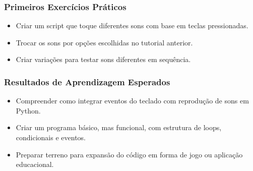 \documentclass[11pt,a4paper]{article}
\begin{document}
\subsubsection*{Primeiros Exercícios Práticos}
\begin{itemize}
    \item Criar um script que toque diferentes sons com base em teclas pressionadas.
    \item Trocar os sons por opções escolhidas no tutorial anterior.
    \item Criar variações para testar sons diferentes em sequência.
\end{itemize}

\subsubsection*{Resultados de Aprendizagem Esperados}
\begin{itemize}
    \item Compreender como integrar eventos do teclado com reprodução de sons em Python.
    \item Criar um programa básico, mas funcional, com estrutura de loops, condicionais e eventos.
    \item Preparar terreno para expansão do código em forma de jogo ou aplicação educacional.
\end{itemize}
\end{document}
